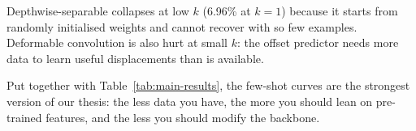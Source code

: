 Depthwise-separable collapses at low $k$ (6.96\% at $k=1$) because it starts from randomly initialised weights and cannot recover with so few examples. Deformable convolution is also hurt at small $k$: the offset predictor needs more data to learn useful displacements than is available.

Put together with Table~\ref{tab:main-results}, the few-shot curves are the strongest version of our thesis: the less data you have, the more you should lean on pre-trained features, and the less you should modify the backbone.
